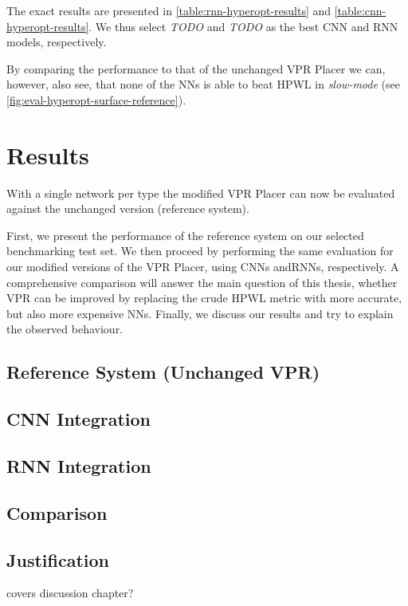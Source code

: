 The exact results are presented in \ref{table:rnn-hyperopt-results} and \ref{table:cnn-hyperopt-results}. We thus select \textit{TODO} and \textit{TODO} as the best \gls{CNN} and \gls{RNN} models, respectively.

By comparing the performance to that of the unchanged \gls{VPR} Placer we can, however, also see, that none of the \glspl{NN} is able to beat \gls{HPWL} in \textit{slow-mode} (see \ref{fig:eval-hyperopt-surface-reference}).

\section{Results}

With a single network per type the modified \gls{VPR} Placer can now be evaluated against the unchanged version (reference system).

First, we present the performance of the reference system on our selected benchmarking test set. We then proceed by performing the same evaluation for our modified versions of the \gls{VPR} Placer, using \glspl{CNN} and\glspl{RNN}, respectively. A comprehensive comparison will answer the main question of this thesis, whether \gls{VPR} can be improved by replacing the crude \gls{HPWL} metric with more accurate, but also more expensive \glspl{NN}. Finally, we discuss our results and try to explain the observed behaviour.

\subsection{Reference System (Unchanged \gls{VPR})}

\subsection{\gls{CNN} Integration}

\subsection{\gls{RNN} Integration}

\subsection{Comparison}

\subsection{Justification}

covers discussion chapter?
